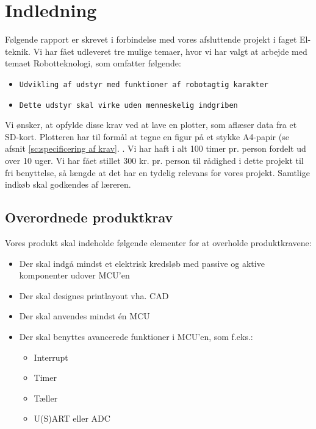 \chapter{Indledning}
\label{ch:indledning}


Følgende rapport er skrevet i forbindelse med vores afsluttende
projekt i faget El-teknik.  Vi har fået udleveret tre mulige temaer,
hvor vi har valgt at arbejde med temaet Robotteknologi, som omfatter
følgende:

\begin{itemize}
\item \texttt{Udvikling af udstyr med funktioner af robotagtig karakter}
\item \texttt{Dette udstyr skal virke uden menneskelig indgriben}
\end{itemize}

Vi ønsker, at opfylde disse krav ved at lave en plotter, som aflæser
data fra et SD-kort. Plotteren har til formål at tegne en figur på et
stykke A4-papir (se afsnit \vref{sc:specificering af krav}.
. Vi
har haft i alt 100 timer pr. person fordelt ud over 10 uger. Vi har
fået stillet 300 kr. pr. person til rådighed i dette projekt til fri
benyttelse, så længde at det har en tydelig relevans for vores
projekt. Samtlige indkøb skal godkendes af læreren.


\section{Overordnede produktkrav}

Vores produkt skal indeholde følgende elementer for at overholde
produktkravene:

\begin{itemize}
\item Der skal indgå mindst et elektrisk kredsløb med passive og
  aktive komponenter udover MCU'en
\item Der skal designes printlayout vha. CAD
\item Der skal anvendes mindst én MCU
\item Der skal benyttes avancerede funktioner i MCU'en, som f.eks.:
  \begin{itemize}
  \item Interrupt
  \item Timer
  \item Tæller
  \item U(S)ART eller ADC
  \end{itemize}
\end{itemize}



